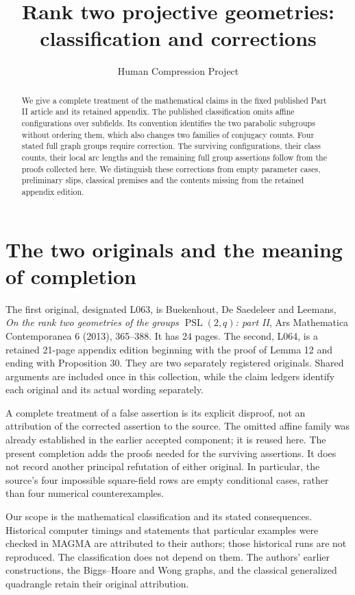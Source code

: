 \documentclass[11pt]{article}
\title{Rank two projective geometries: classification and corrections}
\author{Human Compression Project}\date{}
\newcommand{\PSL}{\operatorname{PSL}}\newcommand{\PGL}{\operatorname{PGL}}
\begin{document}
\maketitle
\begin{abstract}
We give a complete treatment of the mathematical claims in the fixed
published Part II article and its retained appendix. The published
classification omits affine configurations over subfields. Its convention
identifies the two parabolic subgroups without ordering them, which also
changes two families of conjugacy counts. Four stated full graph groups
require correction. The surviving configurations, their class counts,
their local arc lengths and the remaining full group assertions follow
from the proofs collected here. We distinguish these corrections from
empty parameter cases, preliminary slips, classical premises and the
contents missing from the retained appendix edition.
\end{abstract}

\section{The two originals and the meaning of completion}
The first original, designated L063, is Buekenhout, De Saedeleer and
Leemans, \emph{On the rank two geometries of the groups $\PSL(2,q)$:
part II}, Ars Mathematica Contemporanea 6 (2013), 365--388. It has
24 pages. The second, L064, is a retained 21-page appendix edition
beginning with the proof of Lemma 12 and ending with Proposition 30.
They are two separately registered originals. Shared arguments are
included once in this collection, while the claim ledgers identify
each original and its actual wording separately.

A complete treatment of a false assertion is its explicit disproof,
not an attribution of the corrected assertion to the source. The omitted
affine family was already established in the earlier accepted component;
it is reused here. The present completion adds the proofs needed for the
surviving assertions. It does not record another principal refutation of
either original. In particular, the source's four impossible square-field
rows are empty conditional cases, rather than four numerical counterexamples.

Our scope is the mathematical classification and its stated consequences.
Historical computer timings and statements that particular examples were
checked in MAGMA are attributed to their authors; those historical runs
are not reproduced. The classification does not depend on them. The
authors' earlier constructions, the Biggs--Hoare and Wong graphs, and the
classical generalized quadrangle retain their original attribution.
\end{document}
